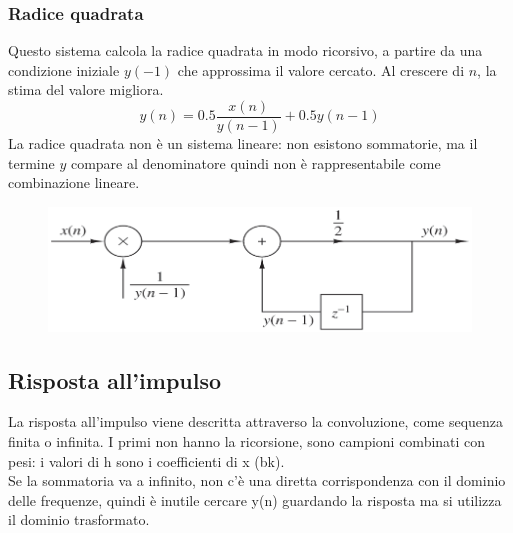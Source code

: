 \newpage
\subsubsection{Radice quadrata}
Questo sistema calcola la radice quadrata in modo ricorsivo, a partire da una condizione iniziale $y(-1)$ che approssima il valore cercato. Al crescere di $n$, la stima del valore migliora.
$$y(n) = 0.5 \frac{x(n)}{y(n-1)} + 0.5y(n-1)$$
La radice quadrata non è un sistema lineare: non esistono sommatorie, ma il termine $y$ compare al denominatore quindi non è rappresentabile come combinazione lineare. 

\begin{figure}[h]
	\centering
	\includegraphics[scale=0.3]{Lezioni/Immagini/radice}
\end{figure}

\subsection{Risposta all'impulso}

La risposta all'impulso viene descritta attraverso la convoluzione, come sequenza finita o infinita. I primi non hanno la ricorsione, sono campioni combinati con pesi: i valori di h sono i coefficienti di x (bk). \\
Se la sommatoria va a infinito, non c'è una diretta corrispondenza con il dominio delle frequenze, quindi è inutile cercare y(n) guardando la risposta ma si utilizza il dominio trasformato.